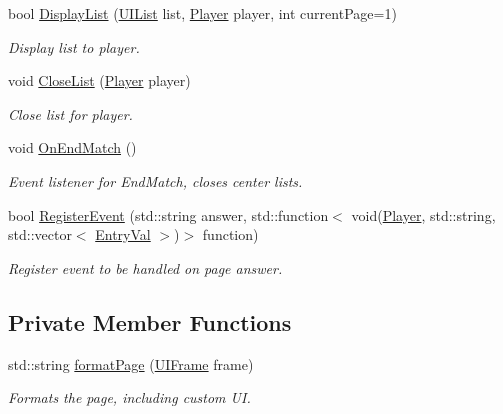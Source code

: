 \begin{DoxyCompactItemize}
bool \hyperlink{classUIManager_aa8187f1c1988d5934adc5c793be85778}{Display\-List} (\hyperlink{structUIList}{U\-I\-List} list, \hyperlink{structPlayer}{Player} player, int current\-Page=1)
\begin{DoxyCompactList}\small\item\em Display list to player. \end{DoxyCompactList}\item 
void \hyperlink{classUIManager_af8510d387057f6778b88d5bcd8bd97a6}{Close\-List} (\hyperlink{structPlayer}{Player} player)
\begin{DoxyCompactList}\small\item\em Close list for player. \end{DoxyCompactList}\item 
\hypertarget{classUIManager_af71f25628d303286cd7f54375314e09b}{void \hyperlink{classUIManager_af71f25628d303286cd7f54375314e09b}{On\-End\-Match} ()}\label{classUIManager_af71f25628d303286cd7f54375314e09b}

\begin{DoxyCompactList}\small\item\em Event listener for End\-Match, closes center lists. \end{DoxyCompactList}\item 
bool \hyperlink{classUIManager_a8192019b49fa0f4b28174ac7f93910fb}{Register\-Event} (std\-::string answer, std\-::function$<$ void(\hyperlink{structPlayer}{Player}, std\-::string, std\-::vector$<$ \hyperlink{structEntryVal}{Entry\-Val} $>$)$>$ function)
\begin{DoxyCompactList}\small\item\em Register event to be handled on page answer. \end{DoxyCompactList}\end{DoxyCompactItemize}
\subsection*{Private Member Functions}
\begin{DoxyCompactItemize}
\item 
std\-::string \hyperlink{classUIManager_a2bfbf770019b05d660ba8f177993c16a}{format\-Page} (\hyperlink{structUIFrame}{U\-I\-Frame} frame)
\begin{DoxyCompactList}\small\item\em Formats the page, including custom U\-I. \end{DoxyCompactList}\end{DoxyCompactItemize}
